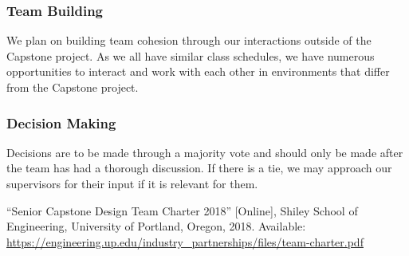 \documentclass{article}
\begin{document}
\subsubsection*{Team Building}

We plan on building team cohesion through our interactions outside of the Capstone
project. As we all have similar class schedules, we have numerous opportunities to
interact and work with each other in environments that differ from the Capstone
project. 

\subsubsection*{Decision Making} 

Decisions are to be made through a majority vote and should only be made after the
team has had a thorough discussion. If there is a tie, we may approach our
supervisors for their input if it is relevant for them.

\newpage{}

\begin{thebibliography}{1}
   ``Senior Capstone Design Team Charter 2018'' [Online], Shiley School of Engineering, University of Portland, Oregon, 2018. Available: \url{https://engineering.up.edu/industry_partnerships/files/team-charter.pdf}
\end{thebibliography}
\end{document}
